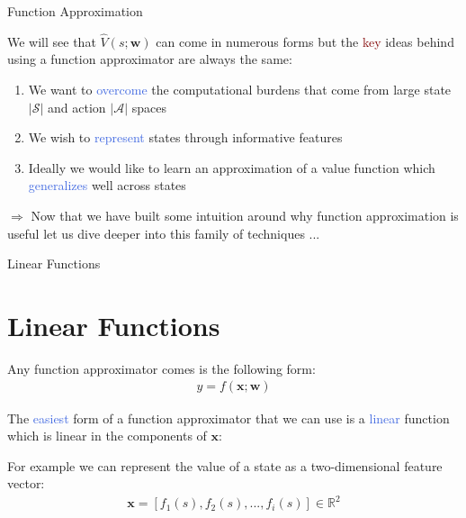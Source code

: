 \documentclass{beamer}
\begin{document}
\begin{frame}{Function Approximation}

	We will see that $\hat{V}(s;\mathbf{w})$ can come in numerous forms but the \textcolor{Maroon}{key} ideas behind using a function approximator are always the same:
	\begin{enumerate}
		\item We want to \textcolor{RoyalBlue}{overcome} the computational burdens that come from large state $|\mathcal{S}|$ and action $|\mathcal{A}|$ spaces
		\item We wish to \textcolor{RoyalBlue}{represent} states through informative features
		\item Ideally we would like to learn an approximation of a value function which \textcolor{RoyalBlue}{generalizes} well across states
	\end{enumerate}

	\bigskip

	$\Rightarrow$ Now that we have built some intuition around why function approximation is useful let us dive deeper into this family of techniques ...


\end{frame}

\begin{frame}{Linear Functions}
	\section{Linear Functions}

	Any function approximator comes is the following form:
	\begin{align*}
		y = f(\mathbf{x};\mathbf{w})
	\end{align*}


	The \textcolor{RoyalBlue}{easiest} form of a function approximator that we can use is a \textcolor{RoyalBlue}{linear} function 	which is linear in the components of $\mathbf{x}$:

	\bigskip

	For example we can represent the value of a state as a two-dimensional feature vector: 
	\begin{align*}
		\mathbf{x}=[f_1(s), f_2(s), ..., f_i(s)] \in \mathds{R}^2
	\end{align*}

\end{frame}
\end{document}
